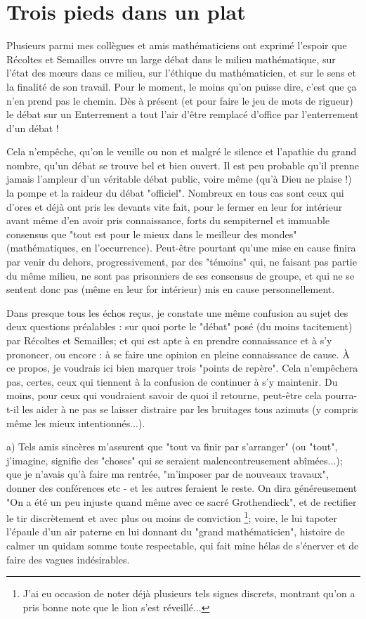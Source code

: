 \section{Trois pieds dans un plat}

Plusieurs parmi mes collègues et amis mathématiciens ont exprimé l'espoir que Récoltes et Semailles ouvre un large débat dans le milieu mathématique, sur l'état des mœurs dans ce milieu, sur l'éthique du mathématicien, et sur le sens et la finalité de son travail. Pour le moment, le moins qu'on puisse dire, c'est que ça n'en prend pas le chemin. Dès à présent (et pour faire le jeu de mots de rigueur) le débat sur un Enterrement a tout l'air d'être remplacé d'office par l'enterrement d'un débat !

Cela n'empêche, qu'on le veuille ou non et malgré le silence et l'apathie du grand nombre, qu'un débat se trouve bel et bien ouvert. Il est peu probable qu'il prenne jamais l'ampleur d'un véritable débat public, voire même (qu'à Dieu ne plaise !) la pompe et la raideur du débat "officiel". Nombreux en tous cas sont ceux qui d'ores et déjà ont pris les devants vite fait, pour le fermer en leur for intérieur avant même d'en avoir pris connaissance, forts du sempiternel et immuable consensus que "tout est pour le mieux dans le meilleur des mondes" (mathématiques, en l'occurrence). Peut-être pourtant qu'une mise en cause finira par venir du dehors, progressivement, par des "témoins" qui, ne faisant pas partie du même milieu, ne sont pas prisonniers de ses consensus de groupe, et qui ne se sentent donc pas (même en leur for intérieur) mis en cause personnellement.

Dans presque tous les échos reçus, je constate une même confusion au sujet des deux questions préalables : sur quoi porte le "débat" posé (du moins tacitement) par Récoltes et Semailles; et qui est apte à en prendre connaissance et à s'y prononcer, ou encore : à se faire une opinion en pleine connaissance de cause. À ce propos, je voudrais ici bien marquer trois "points de repère". Cela n'empêchera pas, certes, ceux qui tiennent à la confusion de continuer à s'y maintenir. Du moins, pour ceux qui voudraient savoir de quoi il retourne, peut-être cela pourra-t-il les aider à ne pas se laisser distraire par les bruitages tous azimuts (y compris même les mieux intentionnés...).

a) Tels amis sincères m'assurent que "tout va finir par s'arranger" (ou "tout", j'imagine, signifie des "choses" qui se seraient malencontreusement abîmées...); que je n'avais qu'à faire ma rentrée, "m'imposer par de nouveaux travaux", donner des conférences etc - et les autres feraient le reste. On dira généreusement "On a été un peu injuste quand même avec ce sacré Grothendieck", et de rectifier le tir discrètement et avec plus ou moins de conviction \footnote{J'ai eu occasion de noter déjà plusieurs tels signes discrets, montrant qu'on a pris bonne note que le lion s'est réveillé...}; voire, le lui tapoter l'épaule d'un air paterne en lui donnant du "grand mathématicien", histoire de calmer un quidam somme toute respectable, qui fait mine hélas de s'énerver et de faire des vagues indésirables.

